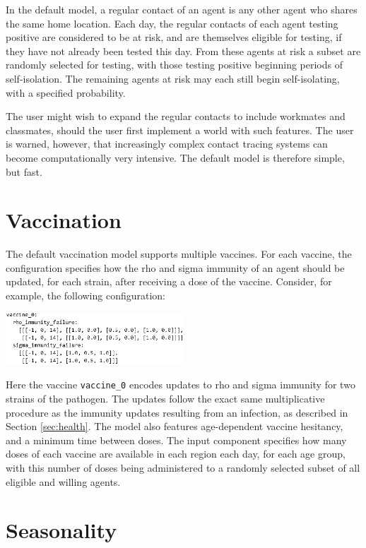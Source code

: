 \documentclass[10pt,letterpaper]{article}
\begin{document}
In the default model, a regular contact of an agent is any other agent who shares the same  home location. Each day, the regular contacts of each agent testing positive are considered to be at risk, and are themselves eligible for testing, if they have not already been tested this day. From these agents at risk a subset are randomly selected for testing, with those testing positive beginning periods of self-isolation. The remaining agents at risk may each still begin self-isolating, with a specified probability.

The user might wish to expand the regular contacts to include workmates and classmates, should the user first implement a world with such features. The user is warned, however, that increasingly complex contact tracing systems can become computationally very intensive. The default model is therefore simple, but fast.

\section{Vaccination}

The default vaccination model supports multiple vaccines. For each vaccine, the configuration specifies how the rho and sigma immunity of an agent should be updated, for each strain, after receiving a dose of the vaccine. Consider, for example, the following configuration:
\begin{center}
\includegraphics[width=0.5\textwidth]{codeexample2bw}
\end{center}
Here the vaccine \texttt{vaccine{\_0}} encodes updates to rho and sigma immunity for two strains of the pathogen. The updates follow the exact same multiplicative procedure as the immunity updates resulting from an infection, as described in Section \ref{sec:health}. The model also features age-dependent vaccine hesitancy, and a minimum time between doses. The input component specifies how many doses of each vaccine are available in each region each day, for each age group, with this number of doses being administered to a randomly selected subset of all eligible and willing agents.

\section{Seasonality}
\end{document}
